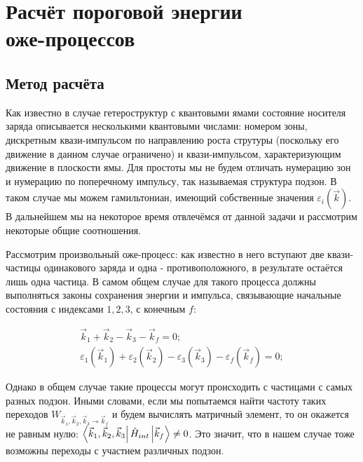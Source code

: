 \documentclass[../main.tex]{subfiles}
\begin{document}
    \chapter{Расчёт пороговой энергии\\ оже-процессов}
    \section{Метод расчёта}

    Как известно в случае гетероструктур с квантовыми ямами состояние
    носителя заряда описывается несколькими квантовыми числами: номером зоны,
    дискретным квази-импульсом по направлению роста струтуры (поскольку его движение
    в данном случае ограничено) и квази-импульсом, характеризующим движение
    в плоскости ямы. Для простоты мы не будем отличать нумерацию зон и нумерацию
    по поперечному импульсу, так называемая структура подзон. В таком случае мы 
    можем гамильтониан, имеющий собственные значения $\varepsilon_i (\vec{k})$. 
    В дальнейшем мы на некоторое время отвлечёмся от данной задачи и 
    рассмотрим некоторые общие соотношения.

    Рассмотрим произвольный оже-процесс: как известно в него вступают две квази-частицы
    одинакового заряда и одна - противоположного, в результате остаётся лишь одна частица.
    В самом общем случае для такого процесса должны выполняться законы сохранения энергии и 
    импульса, связывающие начальные состояния с индексами $1,2,3$, с конечным $f$:

    \begin{equation}
        \begin{array}{l}
            \vec{k}_1 + \vec{k}_2 - \vec{k}_3 - \vec{k}_f = 0;\\
            \varepsilon_1(\vec{k}_1) + \varepsilon_2(\vec{k}_2) - \varepsilon_3(\vec{k}_3) - \varepsilon_f(\vec{k}_f) = 0;
        \end{array}
    \end{equation}

    Однако в общем случае такие процессы могут происходить с частицами с самых 
    разных подзон. Иными словами, если мы попытаемся найти частоту таких переходов
    $W_{\vec{k}_1, \vec{k}_2, \vec{k}_3 \rightarrow \vec{k}_f}$ и будем вычислять
    матричный элемент, то он окажется не равным нулю:
    $\bra{\vec{k}_1, \vec{k}_2, \vec{k}_3} \hat{H}_{int} \ket{\vec{k}_f} \neq 0$.
    Это значит, что в нашем случае тоже возможны переходы с участием различных 
    подзон.
\end{document}
